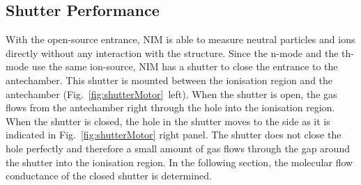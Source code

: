 	\subsection{Shutter Performance} \label{subsubsec:motorflow}
	With the open-source entrance, NIM is able to measure neutral particles and ions directly without any interaction with the structure. Since the n-mode and the th-mode use the same ion-source, NIM has a shutter to close the entrance to the antechamber. This shutter is mounted between the ionisation region and the antechamber (Fig.~\ref{fig:shutterMotor}~left). When the shutter is open, the gas flows from the antechamber right through the hole into the ionisation region. When the shutter is closed, the hole in the shutter moves to the side as it is indicated in Fig.~\ref{fig:shutterMotor} right panel. The shutter does not close the hole perfectly and therefore a small amount of gas flows through the gap around the shutter into the ionisation region. In the following section, the molecular flow conductance of the closed shutter is determined.\\

